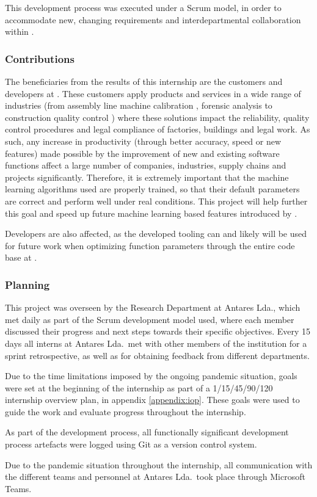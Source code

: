 This development process was executed under a Scrum model, in order to accommodate new, changing requirements and interdepartmental collaboration within \faro.

\subsubsection{Contributions}

The beneficiaries from the results of this internship are the customers and developers at \faro. These customers apply \faro products and services in a wide range of industries (from assembly line machine calibration \parencite{faro_man_eq_align}, forensic analysis \parencite{faro_forensic} to construction quality control \parencite{faro_construction}) where these solutions impact the reliability, quality control procedures and legal compliance of factories, buildings and legal work. As such, any increase in productivity (through better accuracy, speed or new features) made possible by the improvement of new and existing software functions affect a large number of companies, industries, supply chains and projects significantly. Therefore, it is extremely important that the machine learning algorithms used are properly trained, so that their default parameters are correct and perform well under real conditions. This project will help further this goal and speed up future machine learning based features introduced by \faro.

Developers are also affected, as the developed tooling can and likely will be used for future work when optimizing function parameters through the entire code base at \faro.

\subsubsection{Planning}

This project was overseen by the Research Department at Antares Lda., which met daily as part of the Scrum development model used, where each member discussed their progress and next steps towards their specific objectives. Every 15 days all interns at Antares Lda.~met with other members of the institution for a sprint retrospective, as well as for obtaining feedback from different departments.

Due to the time limitations imposed by the ongoing pandemic situation, goals were set at the beginning of the internship as part of a 1/15/45/90/120 internship overview plan, in appendix \ref{appendix:iop}. These goals were used to guide the work and evaluate progress throughout the internship.

As part of the development process, all functionally significant development process artefacts were logged using Git as a version control system.

Due to the pandemic situation throughout the internship, all communication with the different teams and personnel at Antares Lda.~took place through Microsoft Teams.